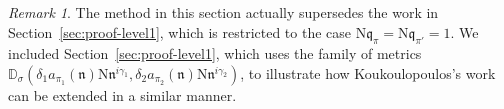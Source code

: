 \documentclass[12pt,reqno]{amsart}
\renewcommand{\tilde}{\widetilde}
\theoremstyle{remark}
\newtheorem*{rek}{Remark}
\renewcommand{\tilde}{\widetilde}
\renewcommand{\tilde}{\widetilde}
\newcommand{\N}{\mathrm{N}}
\newcommand{\kq}{\mathfrak{q}}
\newcommand{\kn}{\mathfrak{n}}
\numberwithin{equation}{section}
\begin{document}


\begin{rek}
    The method in this section actually supersedes the work in Section~\ref{sec:proof-level1}, which is restricted to the case $\N\kq_{\pi}=\N\kq_{\pi'}=1$. We included Section~\ref{sec:proof-level1}, which uses the family of metrics  $\mathbb{D}_{\sigma}(\delta_1a_{\pi_1}(\kn)\N\kn^{i\gamma_1},\delta_2 a_{\pi_2}(\kn)\N\kn^{i\gamma_2})$, to illustrate how Koukoulopoulos’s work can be extended in a similar manner.
\end{rek}



\end{document}
